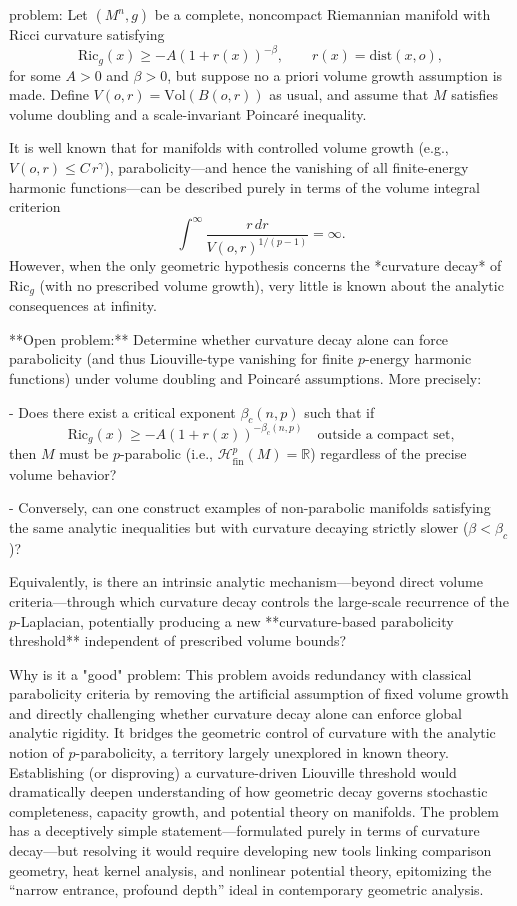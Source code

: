 problem:  
Let \((M^n,g)\) be a complete, noncompact Riemannian manifold with Ricci curvature satisfying  
\[
\mathrm{Ric}_g(x) \ge -A(1+r(x))^{-\beta}, \qquad r(x)=\mathrm{dist}(x,o),
\]
for some \(A>0\) and \(\beta>0\), but suppose no a priori volume growth assumption is made.  
Define \(V(o,r)=\mathrm{Vol}(B(o,r))\) as usual, and assume that \(M\) satisfies volume doubling and a scale-invariant Poincaré inequality.

It is well known that for manifolds with controlled volume growth (e.g., \(V(o,r)\le C\,r^\gamma\)), parabolicity—and hence the vanishing of all finite-energy harmonic functions—can be described purely in terms of the volume integral criterion
\[
\int^\infty \frac{r\,dr}{V(o,r)^{1/(p-1)}} = \infty.
\]
However, when the only geometric hypothesis concerns the *curvature decay* of \(\mathrm{Ric}_g\) (with no prescribed volume growth), very little is known about the analytic consequences at infinity.

**Open problem:**  
Determine whether curvature decay alone can force parabolicity (and thus Liouville-type vanishing for finite \(p\)-energy harmonic functions) under volume doubling and Poincaré assumptions. More precisely:

- Does there exist a critical exponent \(\beta_c(n,p)\) such that if  
  \[
  \mathrm{Ric}_g(x) \ge -A(1+r(x))^{-\beta_c(n,p)} \quad \text{outside a compact set,}
  \]
  then \(M\) must be \(p\)-parabolic (i.e., \(\mathcal{H}^p_{\mathrm{fin}}(M)=\mathbb{R}\)) regardless of the precise volume behavior?
  
- Conversely, can one construct examples of non-parabolic manifolds satisfying the same analytic inequalities but with curvature decaying strictly slower (\(\beta<\beta_c\))?

Equivalently, is there an intrinsic analytic mechanism—beyond direct volume criteria—through which curvature decay controls the large-scale recurrence of the \(p\)-Laplacian, potentially producing a new **curvature-based parabolicity threshold** independent of prescribed volume bounds?

Why is it a "good" problem:  
This problem avoids redundancy with classical parabolicity criteria by removing the artificial assumption of fixed volume growth and directly challenging whether curvature decay alone can enforce global analytic rigidity. It bridges the geometric control of curvature with the analytic notion of \(p\)-parabolicity, a territory largely unexplored in known theory. Establishing (or disproving) a curvature-driven Liouville threshold would dramatically deepen understanding of how geometric decay governs stochastic completeness, capacity growth, and potential theory on manifolds. The problem has a deceptively simple statement—formulated purely in terms of curvature decay—but resolving it would require developing new tools linking comparison geometry, heat kernel analysis, and nonlinear potential theory, epitomizing the “narrow entrance, profound depth” ideal in contemporary geometric analysis.